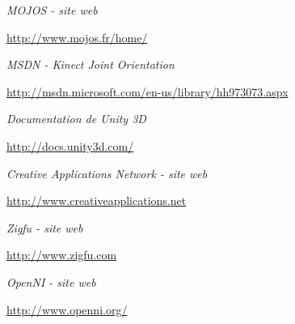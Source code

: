 \begin{thebibliography}{9}
  \emph{MOJOS - site web}\\
  \begin{small}
  \url{http://www.mojos.fr/home/}
  \end{small}
  
  \emph{MSDN - Kinect Joint Orientation}
  \begin{small}
  \url{http://msdn.microsoft.com/en-us/library/hh973073.aspx}
  \end{small}
  
  \emph{Documentation de Unity 3D}\\
  \begin{small}
  \url{http://docs.unity3d.com/}
  \end{small}

  \emph{Creative Applications Network - site web}\\
  \begin{small}
  \url{http://www.creativeapplications.net}
  \end{small}
  
  \emph{Zigfu - site web}\\
  \begin{small}
  \url{http://www.zigfu.com}
  \end{small}

  \emph{OpenNI - site web}\\
  \begin{small}
  \url{http://www.openni.org/}
  \end{small}
  
\end{thebibliography}
        
